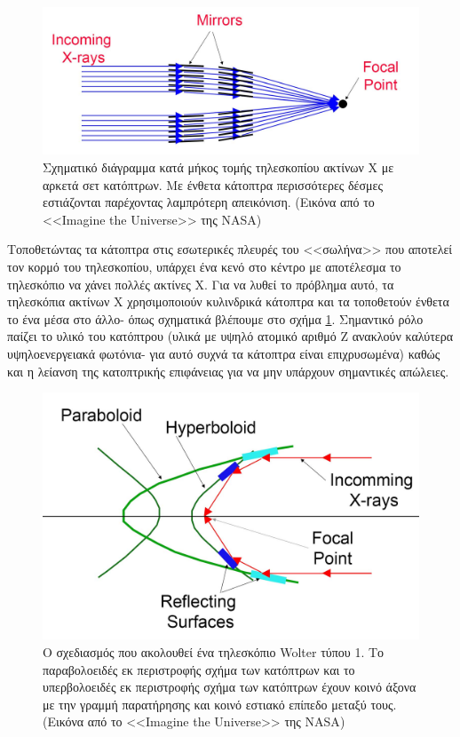 \begin{figure}
 \begin{center}
 \includegraphics[width=0.7\linewidth]{Figures/xray_telescope_multimirror.jpg}
 \caption{Σχηματικό διάγραμμα κατά μήκος τομής τηλεσκοπίου ακτίνων Χ με αρκετά σετ κατόπτρων. Με ένθετα κάτοπτρα περισσότερες δέσμες εστιάζονται παρέχοντας λαμπρότερη απεικόνιση. (Εικόνα από το <<\textlatin{Imagine the Universe}>> της \textlatin{NASA})} \label{fig:multimirror}
 \end{center}
\end{figure}

Τοποθετώντας τα κάτοπτρα στις εσωτερικές πλευρές του <<σωλήνα>> που αποτελεί τον κορμό του τηλεσκοπίου, υπάρχει ένα κενό στο κέντρο με αποτέλεσμα το τηλεσκόπιο να χάνει πολλές ακτίνες Χ. Για να λυθεί το πρόβλημα αυτό, τα τηλεσκόπια ακτίνων Χ χρησιμοποιούν κυλινδρικά κάτοπτρα και τα τοποθετούν ένθετα το ένα μέσα στο άλλο- όπως σχηματικά βλέπουμε στο σχήμα \ref{fig:multimirror}. Σημαντικό ρόλο παίζει το υλικό του κατόπτρου (υλικά με υψηλό ατομικό αριθμό Ζ ανακλούν καλύτερα υψηλοενεργειακά φωτόνια- για αυτό συχνά τα κάτοπτρα είναι επιχρυσωμένα) καθώς και η λείανση της κατοπτρικής επιφάνειας για να μην υπάρχουν σημαντικές απώλειες.

\begin{figure}
 \begin{center}
 \includegraphics[width=0.7\linewidth]{Figures/wolter_typeI.jpg}
 \caption{Ο σχεδιασμός που ακολουθεί ένα τηλεσκόπιο \textlatin{Wolter} τύπου 1. Το παραβολοειδές εκ περιστροφής σχήμα των κατόπτρων και το υπερβολοειδές εκ περιστροφής σχήμα των κατόπτρων έχουν κοινό άξονα με την γραμμή παρατήρησης και κοινό εστιακό επίπεδο μεταξύ τους. (Εικόνα από το <<\textlatin{Imagine the Universe}>> της \textlatin{NASA})} \label{fig:wolter}
 \end{center}
\end{figure} 


